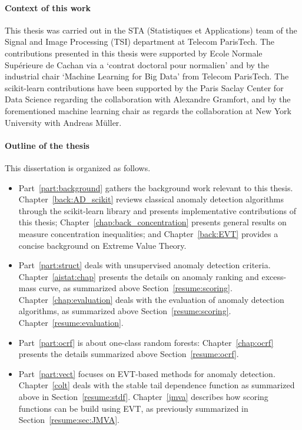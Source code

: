 \paragraph{Context of this work}
This thesis was carried out in the STA (Statistiques et Applications) team of the Signal and Image Processing (TSI) department at Telecom ParisTech. The contributions presented in this thesis were supported by Ecole Normale Supérieure de Cachan via a `contrat doctoral pour normalien' and by the industrial chair `Machine Learning for Big Data' from Telecom ParisTech. The scikit-learn contributions have been supported by the Paris Saclay Center for Data Science regarding the collaboration with Alexandre Gramfort, and by the forementioned machine learning chair as regards the collaboration at New York University with Andreas Müller.

\paragraph{Outline of the thesis}
This dissertation is organized as follows. 
\begin{itemize}
\item Part~\ref{part:background} gathers the background work relevant to this thesis.
Chapter~\ref{back:AD_scikit} reviews classical anomaly detection algorithms through the scikit-learn library and presents implementative contributions of this thesis; Chapter~\ref{chap:back_concentration} presents general results on measure concentration inequalities; and Chapter~\ref{back:EVT} provides a concise background on Extreme Value Theory.

\item Part~\ref{part:struct} deals with unsupervised anomaly detection criteria.
Chapter~\ref{aistat:chap} presents the details on anomaly ranking and excess-mass curve, as summarized above Section~\ref{resume:scoring}. Chapter~\ref{chap:evaluation} deals with the evaluation of anomaly detection algorithms, as summarized above Section~\ref{resume:scoring}. Chapter~\ref{resume:evaluation}.

\item Part~\ref{part:ocrf} is about one-class random forests: Chapter~\ref{chap:ocrf} presents the details %
  summarized above Section~\ref{resume:ocrf}.

\item Part~\ref{part:vect} focuses on EVT-based methods for anomaly detection. Chapter~\ref{colt} deals with the stable tail dependence function as summarized above in Section~\ref{resume:stdf}. Chapter~\ref{jmva} describes how scoring functions can be build using EVT, as previously summarized in Section~\ref{resume:sec:JMVA}.
\end{itemize}
